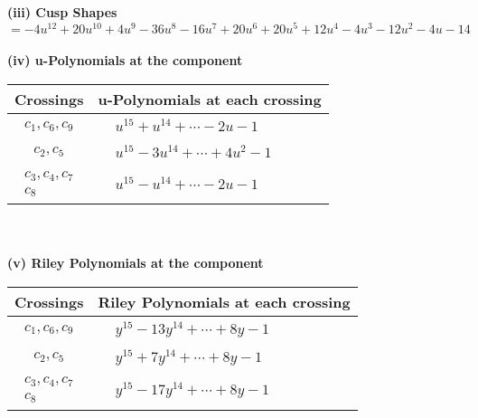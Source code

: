 \documentclass[1p]{elsarticle_modified}
\theoremstyle{definition}
\begin{document}
\flushleft \textbf{(iii) Cusp Shapes $= -4 u^{12}+20 u^{10}+4 u^9-36 u^8-16 u^7+20 u^6+20 u^5+12 u^4-4 u^3-12 u^2-4 u-14$}\\~\\
\newpage\renewcommand{\arraystretch}{1}
\flushleft \textbf{(iv) u-Polynomials at the component}\newline \\
\begin{tabular}{m{50pt}|m{274pt}}
Crossings & \hspace{64pt}u-Polynomials at each crossing \\
\hline $$\begin{aligned}c_{1},c_{6},c_{9}\end{aligned}$$&$\begin{aligned}
&u^{15}+u^{14}+\cdots-2 u-1
\end{aligned}$\\
\hline $$\begin{aligned}c_{2},c_{5}\end{aligned}$$&$\begin{aligned}
&u^{15}-3 u^{14}+\cdots+4 u^2-1
\end{aligned}$\\
\hline $$\begin{aligned}c_{3},c_{4},c_{7}\\c_{8}\end{aligned}$$&$\begin{aligned}
&u^{15}- u^{14}+\cdots-2 u-1
\end{aligned}$\\
\hline
\end{tabular}\\~\\
\newpage\renewcommand{\arraystretch}{1}
\flushleft \textbf{(v) Riley Polynomials at the component}\newline \\
\begin{tabular}{m{50pt}|m{274pt}}
Crossings & \hspace{64pt}Riley Polynomials at each crossing \\
\hline $$\begin{aligned}c_{1},c_{6},c_{9}\end{aligned}$$&$\begin{aligned}
&y^{15}-13 y^{14}+\cdots+8 y-1
\end{aligned}$\\
\hline $$\begin{aligned}c_{2},c_{5}\end{aligned}$$&$\begin{aligned}
&y^{15}+7 y^{14}+\cdots+8 y-1
\end{aligned}$\\
\hline $$\begin{aligned}c_{3},c_{4},c_{7}\\c_{8}\end{aligned}$$&$\begin{aligned}
&y^{15}-17 y^{14}+\cdots+8 y-1
\end{aligned}$\\
\hline
\end{tabular}\\~\\
\end{document}
